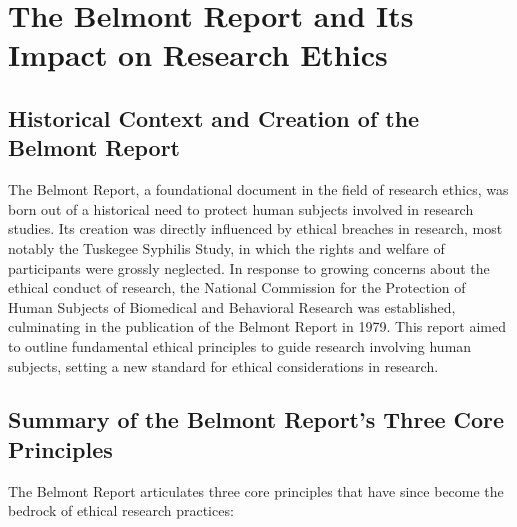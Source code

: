 \documentclass[
]{book}
\begin{document}
\hypertarget{the-belmont-report-and-its-impact-on-research-ethics}{%
\section{The Belmont Report and Its Impact on Research Ethics}\label{the-belmont-report-and-its-impact-on-research-ethics}}

\hypertarget{historical-context-and-creation-of-the-belmont-report}{%
\subsection*{Historical Context and Creation of the Belmont Report}\label{historical-context-and-creation-of-the-belmont-report}}

The Belmont Report, a foundational document in the field of research ethics, was born out of a historical need to protect human subjects involved in research studies. Its creation was directly influenced by ethical breaches in research, most notably the Tuskegee Syphilis Study, in which the rights and welfare of participants were grossly neglected. In response to growing concerns about the ethical conduct of research, the National Commission for the Protection of Human Subjects of Biomedical and Behavioral Research was established, culminating in the publication of the Belmont Report in 1979. This report aimed to outline fundamental ethical principles to guide research involving human subjects, setting a new standard for ethical considerations in research.

\hypertarget{summary-of-the-belmont-reports-three-core-principles}{%
\subsection*{Summary of the Belmont Report's Three Core Principles}\label{summary-of-the-belmont-reports-three-core-principles}}

The Belmont Report articulates three core principles that have since become the bedrock of ethical research practices:
\end{document}
